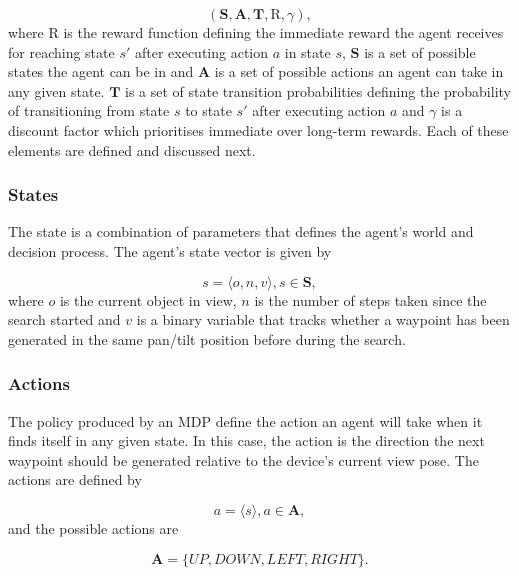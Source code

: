 \documentclass[a4paper, twoside]{article}
\begin{document}
\begin{equation}
  (\mathbf{S}, \mathbf{A}, \mathbf{T}, \text{R}, \gamma), 
\end{equation}
where $\text{R}$ is the reward function defining the immediate reward the agent receives for reaching state $s'$ after executing action $a$ in state $s$, $\mathbf{S}$ is a set of possible states the agent can be in and $\mathbf{A}$ is a set of possible actions an agent can take in any given state. $\mathbf{T}$ is a set of state transition probabilities defining the probability of transitioning from state $s$ to state $s'$ after executing action $a$ and $\gamma$ is a discount factor which prioritises immediate over long-term rewards. Each of these elements are defined and discussed next.

\subsubsection{States}\label{sec:states}

\noindent The state is a combination of parameters that defines the agent's world and decision process. The agent's state vector is given by 

\begin{equation}
  s = \langle{}o, n, v\rangle, s\in{}\mathbf{S}, 
\end{equation}
where $o$ is the current object in view, $n$ is the number of steps taken since the search started and $v$ is a binary variable that tracks whether a waypoint has been generated in the same pan/tilt position before during the search. 

\subsubsection{Actions}

The policy produced by an MDP define the action an agent will take when it finds itself in any given state. In this case, the action is the direction the next waypoint should be generated relative to the device's current view pose. The actions are defined by

\begin{equation}
  a = \langle{}s\rangle, a\in{}\mathbf{A},
\end{equation}
and the possible actions are

\begin{equation}
  \mathbf{A} = \{UP, DOWN, LEFT, RIGHT\}.
\end{equation}
\end{document}
